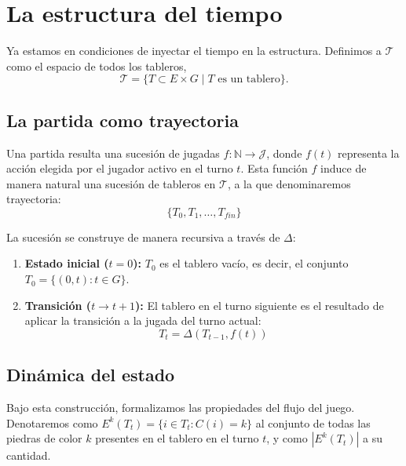 \section{La estructura del tiempo}

Ya estamos en condiciones de inyectar el tiempo en la estructura. Definimos a $\mathcal{T}$ como el espacio de todos los tableros,
$$ \mathcal{T} = \{ T \subset E \times G \mid T \text{ es un tablero}\}.$$

\subsection{La partida como trayectoria}
Una partida resulta una sucesión de jugadas $f:\mathbb{N} \rightarrow \mathcal{J}$, donde $f(t)$ representa la acción elegida por el jugador activo en el turno $t$. Esta función $f$ induce de manera natural una sucesión de tableros en $\mathcal{T}$, a la que denominaremos trayectoria:
$$\{T_0, T_1, \dots, T_{fin}\} $$

La sucesión se construye de manera recursiva a través de $\Delta$:
\begin{enumerate}
	\item \textbf{Estado inicial ($t=0$):} $T_0$ es el tablero vacío, es decir, el conjunto $T_0 = \{(0, t) : t \in G\}$.
	\item \textbf{Transición ($t \rightarrow t+1$):} El tablero en el turno siguiente es el resultado de aplicar la transición a la jugada del turno actual:
	$$ T_t = \Delta(T_{t-1}, f(t)) $$
\end{enumerate}

\subsection{Dinámica del estado}

Bajo esta construcción, formalizamos las propiedades del flujo del juego. Denotaremos como $E^k(T_t) = \{i \in T_t : C(i) = k\}$ al conjunto de todas las piedras de color $k$ presentes en el tablero en el turno $t$, y como $|E^k(T_t)|$ a su cantidad.


